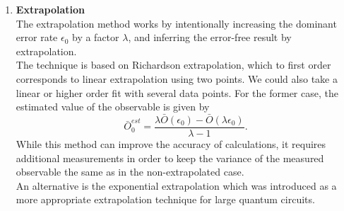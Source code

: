 \begin{enumerate}
    \item \textbf{Extrapolation} \\
    The extrapolation method works by intentionally increasing the dominant error rate $\epsilon_0$ by a factor $\lambda$, and inferring the error-free result by extrapolation. \\
    The technique is based on Richardson extrapolation, which to first order corresponds to linear extrapolation using two points. We could also take a linear or higher order fit with several data points. For the former case, the estimated value of the observable is given by
    \begin{equation}
        \bar{O}_0^{est} = \frac{\lambda \bar{O}(\epsilon_0) - \bar{O}(\lambda \epsilon_0)}{\lambda - 1}.
    \end{equation}
    While this method can improve the accuracy of calculations, it requires additional measurements in order to keep the variance of the measured observable the same as in the non-extrapolated case. \\
    An alternative is the exponential extrapolation which was introduced as a more appropriate extrapolation technique for large quantum circuits.
    

\end{enumerate}
